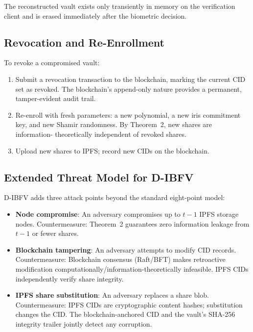 The reconstructed vault exists only transiently in memory on the verification
client and is erased immediately after the biometric decision.

\subsection{Revocation and Re-Enrollment}
\label{sec:revocation_design}

To revoke a compromised vault:
\begin{enumerate}
  \item Submit a revocation transaction to the blockchain, marking the current
  CID set as revoked. The blockchain's append-only nature provides a permanent,
  tamper-evident audit trail.
  \item Re-enroll with fresh parameters: a new polynomial, a new iris commitment
  key, and new Shamir randomness. By Theorem~2, new shares are information-
  theoretically independent of revoked shares.
  \item Upload new shares to IPFS; record new CIDs on the blockchain.
\end{enumerate}

\subsection{Extended Threat Model for D-IBFV}
\label{sec:extended_threats}

D-IBFV adds three attack points beyond the standard eight-point model:

\begin{itemize}
  \item \textbf{Node compromise}: An adversary compromises up to $t{-}1$ IPFS
  storage nodes. Countermeasure: Theorem~2 guarantees zero information leakage
  from $t{-}1$ or fewer shares.

  \item \textbf{Blockchain tampering}: An adversary attempts to modify CID records.
  Countermeasure: Blockchain consensus (Raft/BFT) makes retroactive modification
  computationally/information-theoretically infeasible. IPFS CIDs independently
  verify share integrity.

  \item \textbf{IPFS share substitution}: An adversary replaces a share blob.
  Countermeasure: IPFS CIDs are cryptographic content hashes; substitution
  changes the CID. The blockchain-anchored CID and the vault's SHA-256 integrity
  trailer jointly detect any corruption.
\end{itemize}

